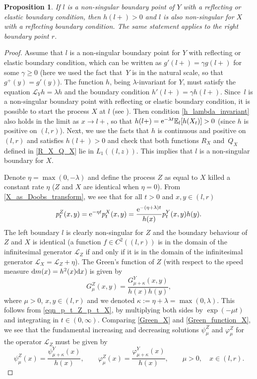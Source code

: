 \documentclass[pdftex]{sigma}
\numberwithin{equation}{section}
\newtheorem{Proposition}[Theorem]{Proposition}
\theoremstyle{definition}
\def\L{{\mathcal L}}
\def\e{{\mathbb E}}
\def\d{{\textnormal d}}
\begin{document}
\begin{Proposition}\label{prop_reflecting}
If $l$ is a non-singular boundary point of $Y$ with a reflecting or elastic boundary condition, then $h(l+)>0$ and $l$ is also
non-singular for $X$ with a reflecting boundary condition. The same statement applies to the right boundary point $r$.
\end{Proposition}
\begin{proof}
Assume that $l$ is a non-singular boundary point for $Y$ with reflecting or elastic boundary condition, which can be written as $g'(l+)=\gamma g(l+)$ for some $\gamma \ge 0$ (here we used the fact that~$Y$ is in the natural scale, so that $g^+(y)=g'(y)$). The function $h$, being $\lambda$-invariant for $Y$, must satisfy the equation $\L_Y h = \lambda h$ and the boundary condition $h'(l+)=\gamma h(l+)$. Since~$l$ is a non-singular boundary point with reflecting or elastic boundary condition, it is possible to start the process $X$ at $l$ (see \cite[Section II.6]{Borodin2002}). Then condition \eqref{h_lambda_invariant} also holds in the limit as $x \to l+$, so that $h(l+)={\rm e}^{-\lambda t} \e_l[h(X_t)]>0$ (since $h$ is positive on $(l,r)$). Next, we use the facts that $h$ is continuous and positive on $(l,r)$ and satisfies $h(l+)>0$ and check that both functions $R_X$ and~$Q_X$ defined in \eqref{R_X_Q_X} lie in $L_1((l,z))$. This implies that $l$ is a non-singular boundary for $X$.

Denote $\eta=\max(0,-\lambda)$ and define the process $Z$ as equal to $X$ killed a constant rate $\eta$ ($Z$ and $X$ are identical when $\eta=0$). From \eqref{X_as_Doobs_transform}, we see that for all $t>0$ and $x,y \in (l,r)$
\begin{equation}\label{eqn_p_t_Z_p_t_X}
p_t^Z(x,y)={\rm e}^{-\eta t} p_t^X(x,y)=\frac{{\rm e}^{-(\eta+\lambda) t}}{h(x)} p_t^Y (x,y) h(y).
\end{equation}
The left boundary $l$ is clearly non-singular for $Z$ and the boundary behaviour of $Z$ and $X$ is identical (a function $f\in C^2((l,r))$ is in the domain of the infinitesimal generator ${\mathcal L}_Z$ if and only if it is in the domain of the infinitesimal generator ${\mathcal L}_X={\mathcal L}_Z+\eta$).
The Green's function of $Z$ (with respect to the speed measure $\d m(x)=h^2(x) \d x$) is given by
\begin{equation}\label{Green_function_X}
G^Z_{\mu}(x,y)=\frac{G^Y_{\mu+\kappa}(x,y)}{h(x) h(y)},
\end{equation}
where $\mu>0$, $x,y \in (l,r)$ and we denoted $\kappa:=\eta+\lambda=\max(0,\lambda)$. This follows from \eqref{eqn_p_t_Z_p_t_X}, by multiplying both sides by $\exp(-\mu t)$ and integrating in $t \in (0,\infty)$. Comparing \eqref{Green_X} and \eqref{Green_function_X}, we see that the fundamental increasing and decreasing solutions $\psi^Z_{\mu}$ and $\varphi^Z_{\mu}$ for the operator $\L_Z$ must be given by
\[
\psi^Z_{\mu}(x)=\frac{\psi^Y_{\mu+\kappa}(x)}{h(x)}, \qquad
\varphi^Z_{\mu}(x)=\frac{\varphi^Y_{\mu+\kappa}(x)}{h(x)}, \qquad \mu>0,\quad  x\in (l,r).
\]


\end{proof}
\end{document}
